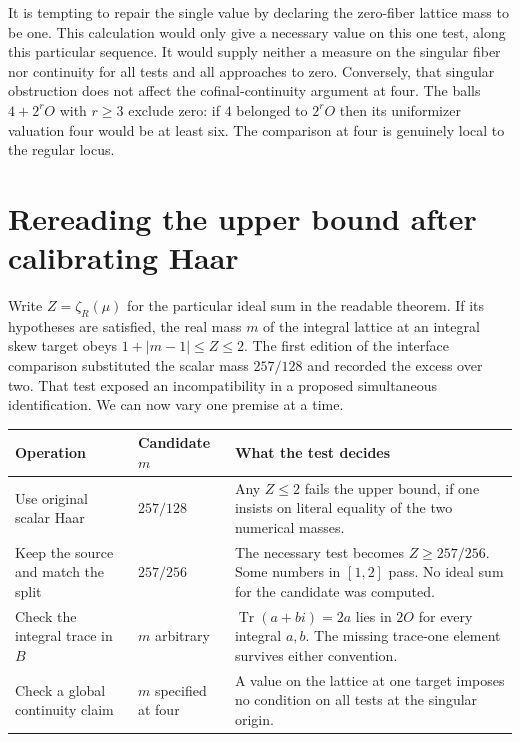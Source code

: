 \documentclass[12pt,letterpaper]{article}
\begin{document}
It is tempting to repair the single value by declaring the zero-fiber lattice mass to be one. This calculation would only give a necessary value on this one test, along this particular sequence. It would supply neither a measure on the singular fiber nor continuity for all tests and all approaches to zero. Conversely, that singular obstruction does not affect the cofinal-continuity argument at four. The balls $4+2^rO$ with $r\ge3$ exclude zero: if $4$ belonged to $2^r O$ then its uniformizer valuation four would be at least six. The comparison at four is genuinely local to the regular locus.



\section{Rereading the upper bound after calibrating Haar}\label{sec:zeta}
Write $Z=\zeta_R(\mu)$ for the particular ideal sum in the readable theorem. If its hypotheses are satisfied, the real mass $m$ of the integral lattice at an integral skew target obeys $1+|m-1|\le Z\le2$. The first edition of the interface comparison substituted the scalar mass $257/128$ and recorded the excess over two. That test exposed an incompatibility in a proposed simultaneous identification. We can now vary one premise at a time.

\begin{center}\small\begin{tabularx}{\linewidth}{@{}p{.21\linewidth}p{.19\linewidth}Y@{}}\toprule
Operation & Candidate $m$ & What the test decides\\\midrule
Use original scalar Haar & $257/128$ & Any $Z\le2$ fails the upper bound, if one insists on literal equality of the two numerical masses.\\
Keep the source and match the split & $257/256$ & The necessary test becomes $Z\ge257/256$. Some numbers in $[1,2]$ pass. No ideal sum for the candidate was computed.\\
Check the integral trace in $B$ & $m$ arbitrary & $\operatorname{Tr}(a+bi)=2a$ lies in $2O$ for every integral $a,b$. The missing trace-one element survives either convention.\\
Check a global continuity claim & $m$ specified at four & A value on the lattice at one target imposes no condition on all tests at the singular origin.\\\bottomrule\end{tabularx}\end{center}
\end{document}
